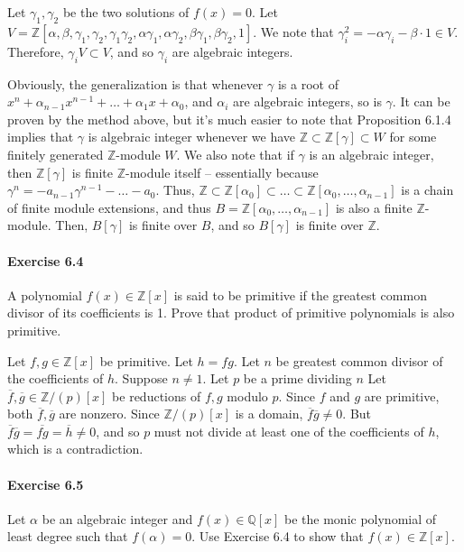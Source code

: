 \documentclass[notitlepage]{article}
\theoremstyle{definition}
\newcommand\Q{\mathbb{Q}}
\newcommand\Z{\mathbb{Z}}
\begin{document}
Let $\gamma_1, \gamma_2$ be the two solutions of $f(x) = 0$. Let $V =
\Z[\alpha, \beta, \gamma_1, \gamma_2, \gamma_1 \gamma_2,
  \alpha \gamma_1, \alpha \gamma_2, \beta \gamma_1, \beta \gamma_2,
  1]$. We note that $\gamma_i^2 = - \alpha \gamma_i - \beta \cdot 1
\in V$. Therefore, $\gamma_i V \subset V$, and so $\gamma_i$ are
algebraic integers.

Obviously, the generalization is that whenever $\gamma$ is a root of
$x^n + \alpha_{n-1} x^{n-1} + \ldots + \alpha_1 x + \alpha_0$, and
$\alpha_i$ are algebraic integers, so is $\gamma$. It can be proven by
the method above, but it's much easier to note that Proposition 6.1.4
implies that $\gamma$ is algebraic integer whenever we have $\Z
\subset \Z[\gamma] \subset W$ for some finitely generated $\Z$-module
$W$. We also note that if $\gamma$ is an algebraic integer, then
$\Z[\gamma]$ is finite $\Z$-module itself -- essentially because
$\gamma^n = -a_{n-1} \gamma^{n-1} - \ldots - a_0$. Thus, $\Z \subset
\Z[\alpha_0] \subset \ldots \subset \Z[\alpha_0, \ldots, \alpha_{n-1}]$
  is a chain of finite module extensions, and thus $B = \Z[\alpha_0,
    \ldots, \alpha_{n-1}]$ is also a finite $\Z$-module. Then,
  $B[\gamma]$ is finite over $B$, and so $B[\gamma]$ is finite over
  $\Z$.

\paragraph{Exercise 6.4}
A polynomial $f(x) \in \Z[x]$ is said to be primitive if the greatest
common divisor of its coefficients is 1. Prove that product of
primitive polynomials is also primitive.

Let $f, g \in \Z[x]$ be primitive. Let $h = fg$. Let $n$ be greatest
common divisor of the coefficients of $h$. Suppose $n \ne 1$. Let $p$
be a prime dividing $n$ Let $\overline{f}, \overline{g} \in \Z/(p)[x]$
be reductions of $f, g$ modulo $p$. Since $f$ and $g$ are primitive,
both $\overline{f}, \overline{g}$ are nonzero. Since $\Z/(p)[x]$ is a
domain, $\overline{f}\overline{g} \ne 0$. But
$\overline{f}\overline{g} = \overline{fg} = \overline{h} \ne 0$, and
so $p$ must not divide at least one of the coefficients of $h$, which
is a contradiction.

\paragraph{Exercise 6.5}
Let $\alpha$ be an algebraic integer and $f(x) \in \Q[x]$ be the monic
polynomial of least degree such that $f(\alpha) = 0$. Use Exercise 6.4
to show that $f(x) \in \Z[x]$.
\end{document}
